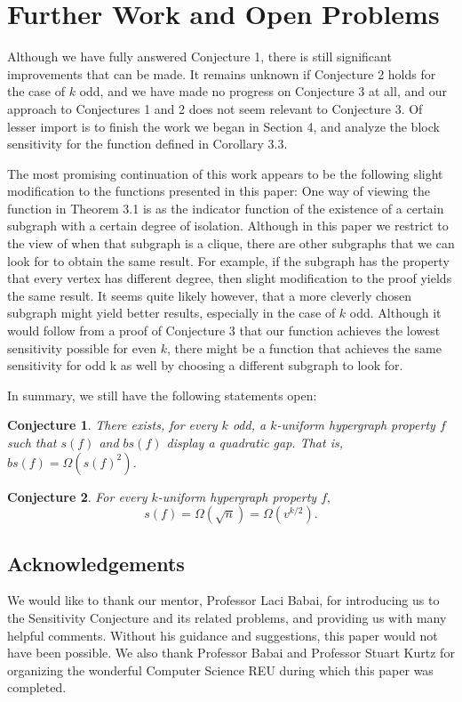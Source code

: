 \documentclass[psamsfonts]{amsart}
\newtheorem*{conj*}{Conjecture}
\theoremstyle{definition}
\theoremstyle{remark}
\numberwithin{equation}{section}
\begin{document}
	\section{Further Work and Open Problems}
		Although we have fully answered Conjecture 1, there is still significant improvements that can be made. It remains unknown if Conjecture 2 holds for the case of $k$ odd, and we have made no progress on Conjecture 3 at all, and our approach to Conjectures 1 and 2 does not seem relevant to Conjecture 3. Of lesser import is to finish the work we began in Section 4, and analyze the block sensitivity for the function defined in Corollary 3.3.

		The most promising continuation of this work appears to be the following slight modification to the functions presented in this paper: One way of viewing the function in Theorem 3.1 is as the indicator function of the existence of a certain subgraph with a certain degree of isolation. Although in this paper we restrict to the view of when that subgraph is a clique, there are other subgraphs that we can look for to obtain the same result. For example, if the subgraph has the property that every vertex has different degree, then slight modification to the proof yields the same result. It seems quite likely however, that a more cleverly chosen subgraph might yield better results, especially in the case of $k$ odd. Although it would follow from a proof of Conjecture 3 that our function achieves the lowest sensitivity possible for even $k$, there might be a function that achieves the same sensitivity for odd k as well by choosing a different subgraph to look for.
	
	In summary, we still have the following statements open:
	\begin{conj*}
		There exists, for every $k$ odd, a $k$-uniform hypergraph property $f$ such that $s(f)$ and $bs(f)$ display a quadratic gap. That is,  $bs(f)=\Omega(s(f)^2)$.
	\end{conj*}
	
	\begin{conj*}
		For every $k$-uniform hypergraph property $f,$ $$s(f)=\Omega(\sqrt{n})=\Omega(v^{k/2}).$$
	\end{conj*}

	\subsection*{Acknowledgements}
		We would like to thank our mentor, Professor Laci Babai, for introducing us to the Sensitivity Conjecture and its related problems, and providing us with many helpful comments.  Without his guidance and suggestions, this paper would not have been possible.  We also thank Professor Babai and Professor Stuart Kurtz for organizing the wonderful Computer Science REU during which this paper was completed.  
\end{document}
